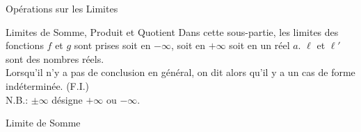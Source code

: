 \documentclass{coursbook}
\begin{document}
    \begin{Gpartie}{Opérations sur les Limites} 
        \begin{Spartie}{Limites de Somme, Produit et Quotient} 
            Dans cette sous-partie, les limites des fonctions $f$ et $g$ sont prises soit en $-\infty$, soit en $+\infty$ soit en un réel $a$. $\ell$ et $\ell'$ sont des nombres réels. \\ Lorsqu'il n'y a pas de conclusion en général, on dit alors qu'il y a un cas de forme indéterminée. (F.I.) \\
            N.B.: $\pm\infty$ désigne $+\infty$ ou $-\infty$. \pagebreak
            \begin{SSpartie}{Limite de Somme} 
                \begin{table}[H]
                    \centering {}
\end{table}
\end{SSpartie}
\end{Spartie}
\end{Gpartie}
\end{document}
